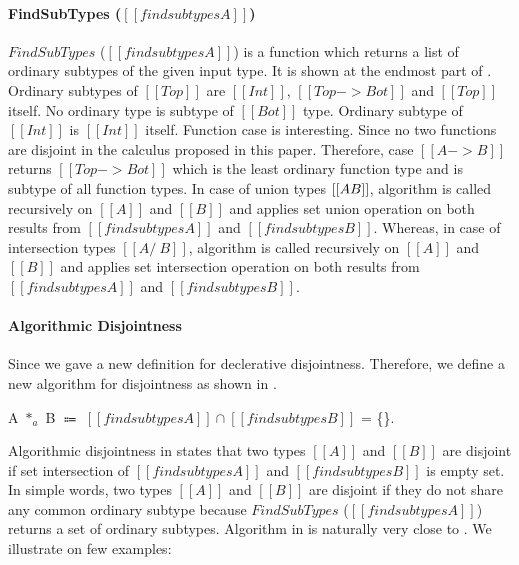 \paragraph{FindSubTypes ($[[findsubtypes A]]$)}
$FindSubTypes$ ($[[findsubtypes A]]$) is a function which returns a list of ordinary subtypes
of the given input type. It is shown at the endmost part of .
Ordinary subtypes of $[[Top]]$ are $[[Int]]$, $[[Top -> Bot]]$ and $[[Top]]$ itself.
No ordinary type is subtype of $[[Bot]]$ type. Ordinary subtype of $[[Int]]$ is $[[Int]]$ itself.
Function case is interesting. Since no two functions are disjoint in the calculus proposed in this paper.
Therefore, case $[[A -> B]]$ returns $[[Top -> Bot]]$ which is the least ordinary function type
and is subtype of all function types. In case of union types $[[A \/ B]]$, algorithm is called recursively on
$[[A]]$ and $[[B]]$ and applies set union operation on both results from  $[[findsubtypes A]]$ and
$[[findsubtypes B]]$. Whereas, in case of intersection types $[[A /\ B]]$, algorithm is called recursively on
$[[A]]$ and $[[B]]$ and applies set intersection operation on both results from  $[[findsubtypes A]]$ and
$[[findsubtypes B]]$.

\paragraph{Algorithmic Disjointness}
Since we gave a new definition for declerative disjointness.
Therefore, we define a new algorithm for disjointness as shown in .

\begin{definition}
\label{def:inter:ad}
  A $*_a$ B $\Coloneqq$  $ [[findsubtypes A]] \cap [[findsubtypes B]] $ = \{\}.
\end{definition} 

\noindent Algorithmic disjointness in  states that two types $[[A]]$ and $[[B]]$ 
are disjoint
if set intersection of $[[findsubtypes A]]$ and $[[findsubtypes B]]$ is empty set. In simple words,
two types $[[A]]$ and $[[B]]$ are disjoint if they do not share any common ordinary subtype because 
$FindSubTypes$ ($[[findsubtypes A]]$) returns a set of ordinary subtypes. Algorithm in 
is naturally very close to . We illustrate  on few examples:

